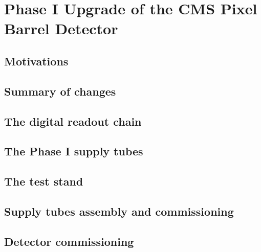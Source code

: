 \chapter{Phase I Upgrade of the CMS Pixel Barrel Detector}
\label{ch:Phase1Intro}

\section{Motivations}

\section{Summary of changes}

\section{The digital readout chain}

\section{The Phase I supply tubes}
  
\section{The test stand}

\section{Supply tubes assembly and commissioning}

\section{Detector commissioning}
